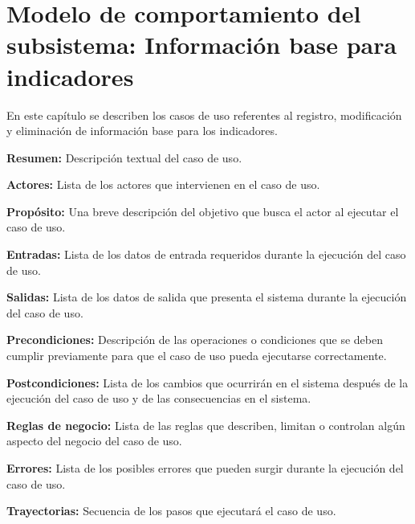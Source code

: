 \documentclass[10pt]{book}
\begin{document}

\chapter{Modelo de comportamiento del subsistema: Información base para indicadores \label{chp:modeloComportamientoInformacionBase}}
     
  En este capítulo se describen los casos de uso referentes al registro, modificación y eliminación de información base para los indicadores. \bigskip

     \begin{objetivos}
	\item {\bf Resumen:} Descripción textual del caso de uso.
	\item {\bf Actores:} Lista de los actores que intervienen en el caso de uso.
	\item {\bf Propósito:} Una breve descripción del objetivo que busca el actor al ejecutar el caso de uso.
	\item {\bf Entradas:} Lista de los datos de entrada requeridos durante la ejecución del caso de uso.
	\item {\bf Salidas:} Lista de los datos de salida que presenta el sistema durante la ejecución del caso de uso.
	\item {\bf Precondiciones:} Descripción de las operaciones o condiciones que se deben cumplir previamente para que el caso de uso pueda ejecutarse correctamente.
	\item {\bf Postcondiciones:} Lista de los cambios que ocurrirán en el sistema después de la ejecución del caso de uso y de las consecuencias en el sistema.
	\item {\bf Reglas de negocio:} Lista de las reglas que describen, limitan o controlan algún aspecto del negocio del caso de uso.
	\item {\bf Errores:} Lista de los posibles errores que pueden surgir durante la ejecución del caso de uso.
	\item {\bf Trayectorias:} Secuencia de los pasos que ejecutará el caso de uso.
    \end{objetivos}
\end{document}
